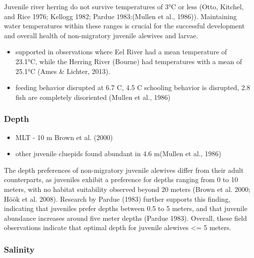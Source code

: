 \documentclass[
]{book}
\providecommand{\tightlist}{%
  \setlength{\itemsep}{0pt}\setlength{\parskip}{0pt}}
\begin{document}
Juvenile river herring do not survive temperatures of 3°C or less (Otto, Kitchel, and Rice 1976; Kellogg 1982; Pardue 1983:(Mullen et al., 1986)).
Maintaining water temperatures within these ranges is crucial for the successful development and overall health of non-migratory juvenile alewives and larvae.

\begin{itemize}
\tightlist
\item
  supported in observations where Eel River had a mean temperature of 23.1°C, while the Herring River (Bourne) had temperatures with a mean of 25.1°C (Ames \& Lichter, 2013).
\item
  feeding behavior disrupted at 6.7 C, 4.5 C schooling behavior is disrupted, 2.8 fish are completely disoriented (Mullen et al., 1986)
\end{itemize}

\hypertarget{depth-1}{%
\subsubsection{Depth}\label{depth-1}}

\begin{itemize}
\tightlist
\item
  MLT - 10 m Brown et al. (2000)
\item
  other juvenile cluepids found abundant in 4.6 m(Mullen et al., 1986)
\end{itemize}

The depth preferences of non-migratory juvenile alewives differ from their adult counterparts, as juveniles exhibit a preference for depths ranging from 0 to 10 meters, with no habitat suitability observed beyond 20 meters (Brown et al. 2000; Höök et al. 2008).
Research by Pardue (1983) further supports this finding, indicating that juveniles prefer depths between 0.5 to 5 meters, and that juvenile abundance increases around five meter depths (Pardue 1983).
Overall, these field observations indicate that optimal depth for juvenile alewives \textless= 5 meters.

\hypertarget{salinity-1}{%
\subsubsection{Salinity}\label{salinity-1}}
\end{document}
